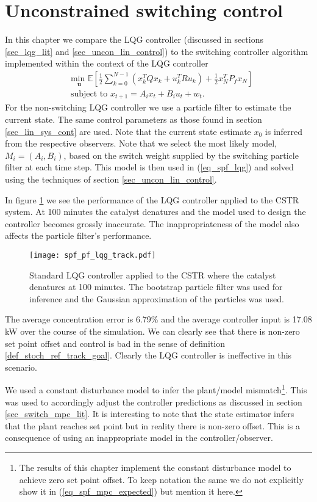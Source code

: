 \section{Unconstrained switching control}
\label{sec_spf_uncon}
In this chapter we compare the LQG controller (discussed in sections \ref{sec_lqg_lit} and \ref{sec_uncon_lin_control}) to the switching controller algorithm implemented within the context of the LQG controller
\begin{equation}
\begin{aligned}
&\underset{\mathbf{u}}{\text{min }} \mathbb{E}\left[ \frac{1}{2}\sum_{k=0}^{N-1} \left( x_k^TQx_k + u_k^TRu_k \right) + \frac{1}{2}x_N^TP_fx_N \right] \\
& \text{subject to } x_{t+1}=A_ix_t+B_iu_t + w_t.
\end{aligned}
\label{eq_spf_lqg}
\end{equation}
For the non-switching LQG controller we use a particle filter to estimate the current state. The same control parameters as those found in section \ref{sec_lin_sys_cont} are used. Note that the current state estimate $x_0$ is inferred from the respective observers. Note that we select the most likely model, $M_i=(A_i, B_i)$, based on the switch weight supplied by the switching particle filter at each time step. This model is then used in (\ref{eq_spf_lqg}) and solved using the techniques of section \ref{sec_uncon_lin_control}.
 
In figure \ref{fig_spf_pf_lqg_track} we see the performance of the LQG controller applied to the CSTR system. At 100 minutes the catalyst denatures and the model used to design the controller becomes grossly inaccurate. The inappropriateness of the model also affects the particle filter's performance. 
\begin{figure}[H] 
\centering
\texttt{[image: spf\_pf\_lqg\_track.pdf]}
\caption{Standard LQG controller applied to the CSTR where the catalyst denatures at 100 minutes. The bootstrap particle filter was used for inference and the Gaussian approximation of the particles was used.}
\label{fig_spf_pf_lqg_track}
\end{figure}
The average concentration error is 6.79\% and the average controller input is 17.08 kW over the course of the simulation. We can clearly see that there is non-zero set point offset and control is bad in the sense of definition \ref{def_stoch_ref_track_goal}. Clearly the LQG controller is ineffective in this scenario.

We used a constant disturbance model to infer the plant/model mismatch\footnote{The results of this chapter implement the constant disturbance model to achieve zero set point offset. To keep notation the same we do not explicitly show it in (\ref{eq_spf_mpc_expected}) but mention it here.}. This was used to accordingly adjust the controller predictions as discussed in section \ref{sec_switch_mpc_lit}. It is interesting to note that the state estimator infers that the plant reaches set point but in reality there is non-zero offset. This is a consequence of using an inappropriate model in the controller/observer. 

